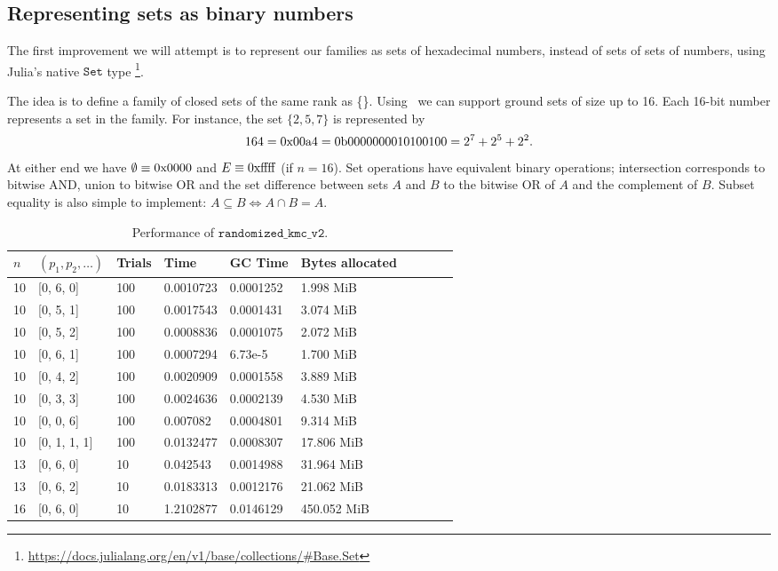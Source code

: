 \subsection{Representing sets as binary numbers}
The first improvement we will attempt is to represent our families as sets of hexadecimal numbers, instead of sets of sets of numbers, using Julia's native $\texttt{Set}$ type \footnote{\href{https://docs.julialang.org/en/v1/base/collections/\#Base.Set}{https://docs.julialang.org/en/v1/base/collections/\#Base.Set}}. 

The idea is to define a family of closed sets of the same rank as \Set\{\UIntSixteen\}. Using \UIntSixteen\ we can support ground sets of size up to 16. Each 16-bit number represents a set in the family. For instance, the set $\{ 2,5,7 \}$ is represented by $$164 = 0\rm{x}00\rm{a}4 = 0\rm{b}0000000010100100 = 2^7+2^5+2^2.$$ At either end we have $\emptyset \equiv 0\rm{x}0000$ and $E \equiv 0\rm{xffff}$ (if $n = 16$). Set operations have equivalent binary operations; intersection corresponds to bitwise AND, union to bitwise OR and the set difference between sets $A$ and $B$ to the bitwise OR of $A$ and the complement of $B$. Subset equality is also simple to implement: $A \subseteq B \iff A \cap B = A.$ 

\begin{table*}[ht!]
  \centering
  \caption{Performance of $\texttt{randomized\_kmc\_v2}$.}
  \label{tab:perf_v2}
  \begin{threeparttable}
    \begin{tabular}{llllllllll}
      \toprule
      $n$ & $(p_1, p_2, \ldots)$ & Trials & Time  & GC Time & Bytes allocated \\
      \midrule
      10 & [0, 6, 0] & 100 & 0.0010723 & 0.0001252 & 1.998 MiB \\ 
      10 & [0, 5, 1] & 100 & 0.0017543 & 0.0001431 & 3.074 MiB \\ 
      10 & [0, 5, 2] & 100 & 0.0008836 & 0.0001075 & 2.072 MiB \\ 
      10 & [0, 6, 1] & 100 & 0.0007294 & 6.73e-5 & 1.700 MiB \\ 
      10 & [0, 4, 2] & 100 & 0.0020909 & 0.0001558 & 3.889 MiB \\ 
      10 & [0, 3, 3] & 100 & 0.0024636 & 0.0002139 & 4.530 MiB \\ 
      10 & [0, 0, 6] & 100 & 0.007082 & 0.0004801 & 9.314 MiB \\ 
      10 & [0, 1, 1, 1] & 100 & 0.0132477 & 0.0008307 & 17.806 MiB \\ 
      13 & [0, 6, 0] & 10 & 0.042543 & 0.0014988 & 31.964 MiB \\ 
      13 & [0, 6, 2] & 10 & 0.0183313 & 0.0012176 & 21.062 MiB \\ 
      16 & [0, 6, 0] & 10 & 1.2102877 & 0.0146129 & 450.052 MiB \\ 
      \bottomrule
    \end{tabular}
  \end{threeparttable}
\end{table*}

